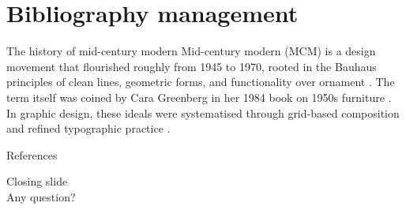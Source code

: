 \documentclass[aspectratio=169]{beamer}
\begin{document}
\section{Bibliography management}

\begin{frame}{The history of mid-century modern}
  Mid-century modern (MCM) is a design movement that flourished
  roughly from 1945 to 1970, rooted in the Bauhaus principles of
  clean lines, geometric forms, and functionality over ornament
  \parencite{wikipedia2024}. The term itself was coined by
  Cara Greenberg in her 1984 book on 1950s furniture
  \parencite{greenberg1984}. In graphic design, these ideals were
  systematised through grid-based composition
  \parencite{müller-brockmann1981} and refined typographic practice
  \parencite{bringhurst2004}.
\end{frame}

\begin{frame}{References}
  \printbibliography[heading=none]
\end{frame}


{
\begin{frame}
  \begin{center}
    \Large
    Closing slide\\
    Any question?
  \end{center}
\end{frame}
}


\appendix
\end{document}
